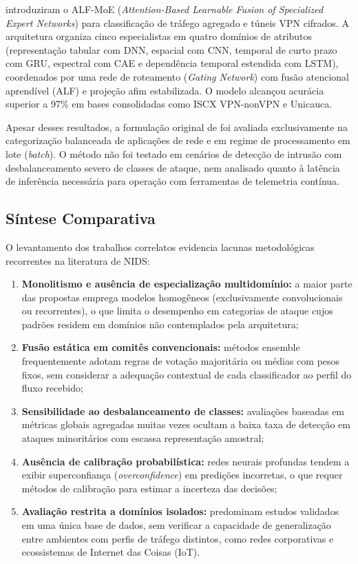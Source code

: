  introduziram o ALF-MoE (\emph{Attention-Based Learnable Fusion of Specialized Expert
Networks}) para classificação de tráfego agregado e túneis VPN cifrados. A arquitetura organiza cinco especialistas
em quatro domínios de atributos (representação tabular com DNN, espacial com CNN, temporal de curto prazo com GRU,
espectral com CAE e dependência temporal estendida com LSTM), coordenados por uma rede de roteamento (\emph{Gating
Network}) com fusão atencional aprendível (ALF) e projeção afim estabilizada. O modelo alcançou acurácia superior a
97\% em bases consolidadas como ISCX VPN-nonVPN e Unicauca.

Apesar desses resultados, a formulação original de  foi avaliada exclusivamente na
categorização balanceada de aplicações de rede e em regime de processamento em lote (\emph{batch}). O método não foi
testado em cenários de detecção de intrusão com desbalanceamento severo de classes de ataque, nem analisado quanto à
latência de inferência necessária para operação com ferramentas de telemetria contínua.

\subsection{Síntese Comparativa}
\label{subsec:sintese_comparativa}

O levantamento dos trabalhos correlatos evidencia lacunas metodológicas recorrentes na literatura de NIDS:

\begin{enumerate}
    \item \textbf{Monolitismo e ausência de especialização multidomínio:} a maior parte das propostas emprega modelos
    homogêneos (exclusivamente convolucionais ou recorrentes), o que limita o desempenho em categorias de ataque cujos
    padrões residem em domínios não contemplados pela arquitetura;
    \item \textbf{Fusão estática em comitês convencionais:} métodos ensemble frequentemente adotam regras de votação
    majoritária ou médias com pesos fixos, sem considerar a adequação contextual de cada classificador ao perfil do
    fluxo recebido;
    \item \textbf{Sensibilidade ao desbalanceamento de classes:} avaliações baseadas em métricas globais agregadas
    muitas vezes ocultam a baixa taxa de detecção em ataques minoritários com escassa representação amostral;
    \item \textbf{Ausência de calibração probabilística:} redes neurais profundas tendem a exibir superconfiança
    (\emph{overconfidence}) em predições incorretas, o que requer métodos de calibração para estimar a incerteza das
    decisões;
    \item \textbf{Avaliação restrita a domínios isolados:} predominam estudos validados em uma única base de dados,
    sem verificar a capacidade de generalização entre ambientes com perfis de tráfego distintos, como redes
    corporativas e ecossistemas de Internet das Coisas (IoT).
\end{enumerate}


